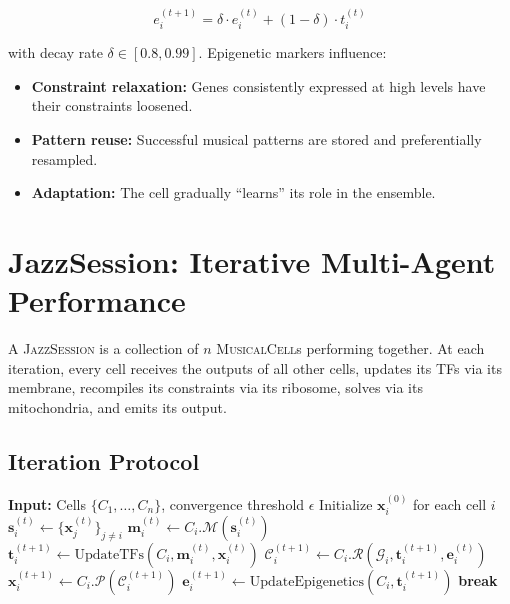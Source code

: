 \documentclass[11pt,a4paper]{article}
\newcommand{\MusicalCell}{\textsc{MusicalCell}}
\newcommand{\JazzSession}{\textsc{JazzSession}}
\newcommand{\calG}{\mathcal{G}}
\newcommand{\calC}{\mathcal{C}}
\begin{document}
\begin{equation}
  e_i^{(t+1)} = \delta \cdot e_i^{(t)} + (1 - \delta) \cdot t_i^{(t)}
\end{equation}

with decay rate $\delta \in [0.8, 0.99]$. Epigenetic markers influence:
\begin{itemize}
  \item \textbf{Constraint relaxation:} Genes consistently expressed at high levels have their constraints loosened.
  \item \textbf{Pattern reuse:} Successful musical patterns are stored and preferentially resampled.
  \item \textbf{Adaptation:} The cell gradually ``learns'' its role in the ensemble.
\end{itemize}

\section{JazzSession: Iterative Multi-Agent Performance}\label{sec:jazzsession}

A \JazzSession{} is a collection of $n$ \MusicalCell{}s performing together. At each iteration, every cell receives the outputs of all other cells, updates its TFs via its membrane, recompiles its constraints via its ribosome, solves via its mitochondria, and emits its output.

\subsection{Iteration Protocol}

\begin{algorithm}[h]
\caption{\JazzSession{} Iteration}\label{alg:jazz}
\begin{algorithmic}[1]
\State \textbf{Input:} Cells $\{C_1, \ldots, C_n\}$, convergence threshold $\epsilon$
\State Initialize $\mathbf{x}_i^{(0)}$ for each cell $i$
    \State $\mathbf{s}_i^{(t)} \gets \{\mathbf{x}_j^{(t)}\}_{j \neq i}$ 
    \State $\mathbf{m}_i^{(t)} \gets C_i.\mathcal{M}(\mathbf{s}_i^{(t)})$ 
    \State $\mathbf{t}_i^{(t+1)} \gets \text{UpdateTFs}(C_i, \mathbf{m}_i^{(t)}, \mathbf{x}_i^{(t)})$
    \State $\calC_i^{(t+1)} \gets C_i.\mathcal{R}(\calG_i, \mathbf{t}_i^{(t+1)}, \mathbf{e}_i^{(t)})$ 
    \State $\mathbf{x}_i^{(t+1)} \gets C_i.\mathcal{P}(\calC_i^{(t+1)})$ 
    \State $\mathbf{e}_i^{(t+1)} \gets \text{UpdateEpigenetics}(C_i, \mathbf{t}_i^{(t+1)})$
  \EndFor
    \State \textbf{break} 
  \EndIf
\EndFor
\end{algorithmic}
\end{algorithm}
\end{document}
